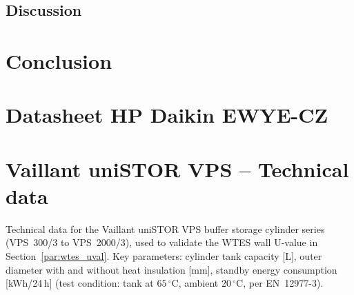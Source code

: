 \documentclass[11pt,a4paper]{report}
\begin{document}
\section{Discussion}
\label{sec:results_discussion}


\chapter{Conclusion}
\label{chap:conclusion}





\appendix

\chapter{Datasheet HP Daikin EWYE-CZ}
\label{appendix:datasheet_hthp}




\chapter{Vaillant uniSTOR VPS -- Technical data}
\label{appendix:vps_datasheet}

\noindent Technical data for the Vaillant uniSTOR VPS buffer storage cylinder series
(VPS~300/3 to VPS~2000/3), used to validate the WTES wall U-value in
Section~\ref{par:wtes_uval}.
Key parameters: cylinder tank capacity [L], outer diameter with and without heat
insulation [mm], standby energy consumption [kWh/24\,h] (test condition: tank at
$65\,^{\circ}\mathrm{C}$, ambient $20\,^{\circ}\mathrm{C}$, per EN~12977-3).
\end{document}
